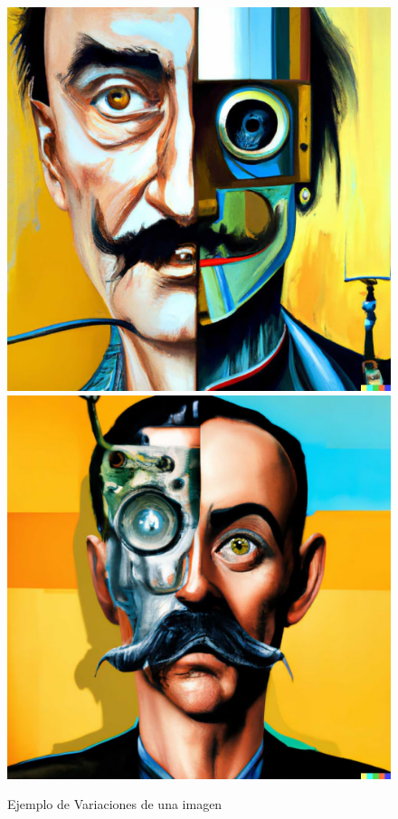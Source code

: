 \documentclass[runningheads]{llncs} %
\begin{document}
\begin{figure}
    \centering
    \includegraphics[scale=0.15]{ej4.1-dalle_1.jpg}
    \includegraphics[scale=0.15]{ej4.2-dalle_1.jpg}
    \caption{Ejemplo de Variaciones de una imagen \cite{ej-dalle}}
    \label{fig:dalle-ej4}
\end{figure}
\newpage
\end{document}
